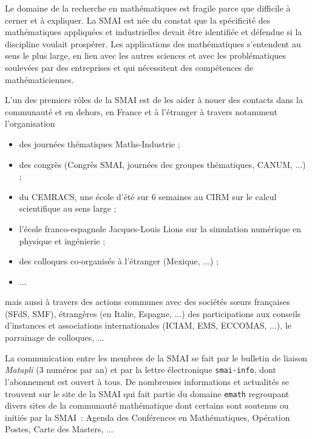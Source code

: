 Le domaine de la recherche en math\'ematiques est fragile parce que difficile \`a
cerner et \`a expliquer. La SMAI est n\'ee du constat
que la sp\'ecificit\'e des math\'ematiques appliqu\'ees et industrielles devait \^etre
identifi\'ee et d\'efendue si la discipline voulait prosp\'erer. Les
applications des math\'ematiques s'entendent au sens le plus large,
en lien avec les autres sciences et avec les probl\'ematiques
soulev\'ees par des entreprises et qui n\'ecessitent des comp\'etences de math\'ematicien\mp ne\mp s.

L'un des premiers r\^oles de la SMAI est de les aider \`a nouer des contacts dans la communaut\'e
et en dehors, en France et \`a l'\'etranger \`a travers notamment
l'organisation
\begin{itemize}%
    \item des journ\'ees th\'ematiques Maths-Industrie ;
    \item des congr\`es (Congr\`es SMAI, journ\'ees des groupes th\'ematiques, CANUM, ...) ;
    \item du CEMRACS, une \'ecole d'\'et\'e sur 6 semaines au CIRM sur le calcul scientifique
	au sens large ;
    \item l'\'ecole franco-espagnole Jacques-Louis Lions sur la simulation num\'erique en
	physique et ing\'enierie ;
    \item des colloques co-organis\'es \`a l'\'etranger (Mexique, ...) ;
    \item ...
\end{itemize}
mais aussi \`a travers des actions communes avec des soci\'et\'es
s\oe urs fran\c caises (SFdS, SMF), \'etrang\`eres (en Italie, Espagne, ...)
des participations aux conseils d'instances et associations internationales (ICIAM,
EMS, ECCOMAS, ...), le parrainage de colloques, ...

La communication entre les membres de la SMAI se fait par le bulletin de
liaison \emph{Matapli} (3 num\'eros par an) et par la lettre \'electronique
\texttt{smai-info}, dont l'abonnement est ouvert \`a tous. De nombreuses
informations et actualit\'es se trouvent sur le site de la SMAI qui fait partie
du domaine \texttt{emath} regroupant divers sites de la communaut\'e
math\'ematique dont certains sont soutenus ou initi\'es par la SMAI~:
Agenda des Conf\'erences en Math\'ematiques, Op\'eration Postes, Carte des Masters, ...

